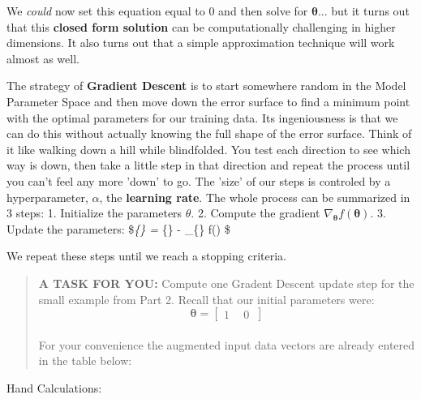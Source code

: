 \documentclass[11pt]{article}
\begin{document}
We \emph{could} now set this equation equal to \(0\) and then solve for
\(\boldsymbol{\theta}\)... but it turns out that this \textbf{closed
form solution} can be computationally challenging in higher dimensions.
It also turns out that a simple approximation technique will work almost
as well.

The strategy of \textbf{Gradient Descent} is to start somewhere random
in the Model Parameter Space and then move down the error surface to
find a minimum point with the optimal parameters for our training data.
Its ingeniousness is that we can do this without actually knowing the
full shape of the error surface. Think of it like walking down a hill
while blindfolded. You test each direction to see which way is down,
then take a little step in that direction and repeat the process until
you can't feel any more 'down' to go. The 'size' of our steps is
controled by a hyperparameter, \(\alpha\), the \textbf{learning rate}.
The whole process can be summarized in 3 steps: 1. Initialize the
parameters \(\theta\). 2. Compute the gradient
\(\nabla_{\boldsymbol{\theta}} f(\boldsymbol{\theta})\). 3. Update the
parameters: \$\theta\emph{\{\} = \theta}\{\} -
\alpha \cdot \nabla\_\{\boldsymbol{\theta}\} f(\boldsymbol{\theta}) \$

We repeat these steps until we reach a stopping criteria.

    \begin{quote}
\textbf{A TASK FOR YOU:} Compute one Gradent Descent update step for the
small example from Part 2. Recall that our initial parameters were:
\[ \boldsymbol{\theta} = \begin{bmatrix} 1 \ \quad 0 \ \end{bmatrix}\]\\
For your convenience the augmented input data vectors are already
entered in the table below:
\end{quote}

Hand Calculations:
\end{document}
